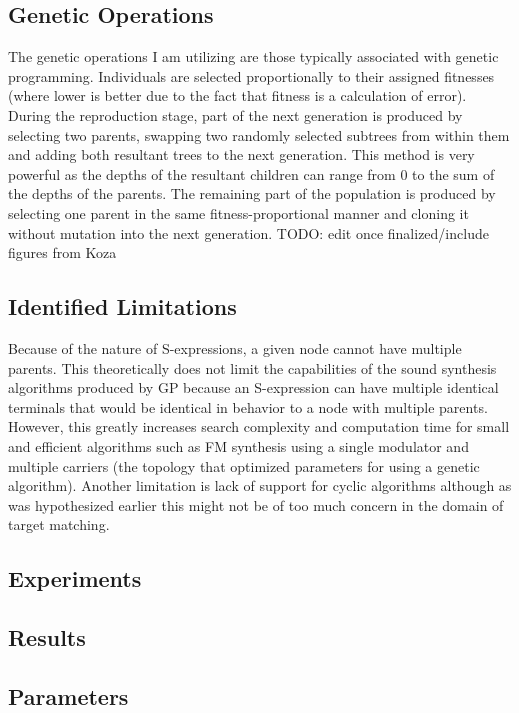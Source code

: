 \documentclass[12pt]{article}
\begin{document}
\subsection{Genetic Operations}
The genetic operations I am utilizing are those typically associated with genetic programming. Individuals are selected proportionally to their assigned fitnesses (where lower is better due to the fact that fitness is a calculation of error). During the reproduction stage, part of the next generation is produced by selecting two parents, swapping two randomly selected subtrees from within them and adding both resultant trees to the next generation. This method is very powerful as the depths of the resultant children can range from 0 to the sum of the depths of the parents. The remaining part of the population is produced by selecting one parent in the same fitness-proportional manner and cloning it without mutation into the next generation. TODO: edit once finalized/include figures from Koza
\subsection{Identified Limitations}
Because of the nature of S-expressions, a given node cannot have multiple parents. This theoretically does not limit the capabilities of the sound synthesis algorithms produced by GP because an S-expression can have multiple identical terminals that would be identical in behavior to a node with multiple parents. However, this greatly increases search complexity and computation time for small and efficient algorithms such as FM synthesis using a single modulator and multiple carriers (the topology that \citep{horner1993machine} optimized parameters for using a genetic algorithm). Another limitation is lack of support for cyclic algorithms although as was hypothesized earlier this might not be of too much concern in the domain of target matching.
\subsection{Experiments}
\subsection{Results}
\subsection{Parameters}
\end{document}
